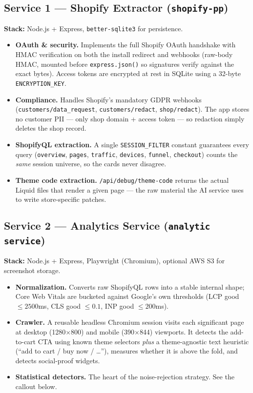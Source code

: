 \documentclass[11pt,a4paper]{article}
\begin{document}
\subsection{Service 1 --- Shopify Extractor (\texttt{shopify-pp})}

\textbf{Stack:} Node.js + Express, \texttt{better-sqlite3} for persistence.

\begin{itemize}[leftmargin=1.4em]
  \item \textbf{OAuth \& security.} Implements the full Shopify OAuth handshake
  with HMAC verification on both the install redirect and webhooks (raw-body
  HMAC, mounted before \texttt{express.json()} so signatures verify against the
  exact bytes). Access tokens are encrypted at rest in SQLite using a 32-byte
  \texttt{ENCRYPTION\_KEY}.
  \item \textbf{Compliance.} Handles Shopify's mandatory GDPR webhooks
  (\texttt{customers/data\_request}, \texttt{customers/redact},
  \texttt{shop/redact}). The app stores no customer PII --- only shop domain +
  access token --- so redaction simply deletes the shop record.
  \item \textbf{ShopifyQL extraction.} A single \texttt{SESSION\_FILTER}
  constant guarantees every query (\texttt{overview}, \texttt{pages},
  \texttt{traffic}, \texttt{devices}, \texttt{funnel}, \texttt{checkout})
  counts the \emph{same} session universe, so the cards never disagree.
  \item \textbf{Theme code extraction.} \texttt{/api/debug/theme-code} returns
  the actual Liquid files that render a given page --- the raw material the AI
  service uses to write store-specific patches.
\end{itemize}

\subsection{Service 2 --- Analytics Service (\texttt{analytic service})}

\textbf{Stack:} Node.js + Express, Playwright (Chromium), optional AWS S3 for
screenshot storage.

\begin{itemize}[leftmargin=1.4em]
  \item \textbf{Normalization.} Converts raw ShopifyQL rows into a stable
  internal shape; Core Web Vitals are bucketed against Google's own thresholds
  (LCP good $\le 2500$ms, CLS good $\le 0.1$, INP good $\le 200$ms).
  \item \textbf{Crawler.} A reusable headless Chromium session visits each
  significant page at desktop (1280$\times$800) and mobile (390$\times$844)
  viewports. It detects the add-to-cart CTA using known theme selectors
  \emph{plus} a theme-agnostic text heuristic (``add to cart / buy now / \dots''),
  measures whether it is above the fold, and detects social-proof widgets.
  \item \textbf{Statistical detectors.} The heart of the noise-rejection
  strategy. See the callout below.
\end{itemize}
\end{document}

